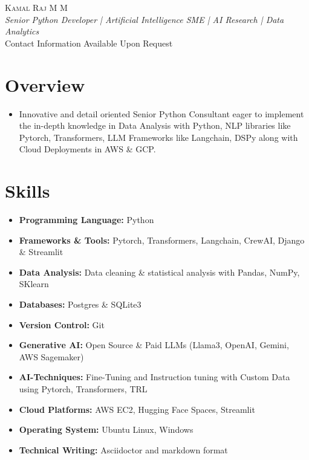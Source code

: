\documentclass[11pt,a4paper]{article}
\newcommand{\resumeItem}[1]{\item #1}
\begin{document}
\begin{center}
    {\Huge \scshape Kamal Raj M M} \\ \vspace{5pt}
    \textit{Senior Python Developer | Artificial Intelligence SME | AI Research | Data Analytics} \\ \vspace{3pt}
    \small
    Contact Information Available Upon Request
\end{center}

\section{Overview}
\begin{itemize}[leftmargin=*]
    \resumeItem{Innovative and detail oriented Senior Python Consultant eager to implement the in-depth knowledge in Data Analysis with Python, NLP libraries like Pytorch, Transformers, LLM Frameworks like Langchain, DSPy along with Cloud Deployments in AWS \& GCP.}
\end{itemize}

\section{Skills}
\begin{itemize}[leftmargin=*]
    \item \textbf{Programming Language:} Python
    \item \textbf{Frameworks \& Tools:} Pytorch, Transformers, Langchain, CrewAI, Django \& Streamlit
    \item \textbf{Data Analysis:} Data cleaning \& statistical analysis with Pandas, NumPy, SKlearn
    \item \textbf{Databases:} Postgres \& SQLite3
    \item \textbf{Version Control:} Git
    \item \textbf{Generative AI:} Open Source \& Paid LLMs (Llama3, OpenAI, Gemini, AWS Sagemaker)
    \item \textbf{AI-Techniques:} Fine-Tuning and Instruction tuning with Custom Data using Pytorch, Transformers, TRL
    \item \textbf{Cloud Platforms:} AWS EC2, Hugging Face Spaces, Streamlit
    \item \textbf{Operating System:} Ubuntu Linux, Windows
    \item \textbf{Technical Writing:} Asciidoctor and markdown format
\end{itemize}
\end{document}
